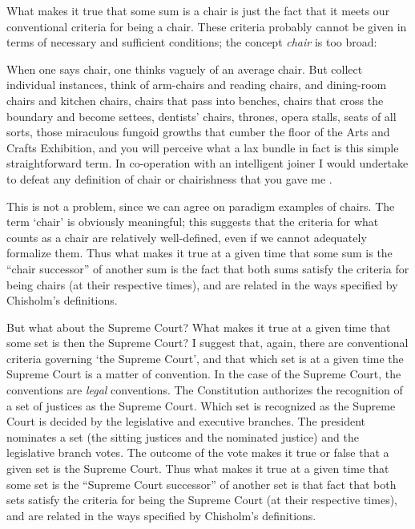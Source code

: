\documentclass[11pt]{article}
\newenvironment{squote}{%
\begin{spacing}{1}
\begin{list}{}{%
\setlength{\labelwidth}{0pt}%
\rightmargin\leftmargin%
}
\item\relax
}{%
\end{list}%
\end{spacing}
}
\begin{document}
\begin{spacing}{1.5}
What makes it true that some sum is a chair is just the fact that it
meets our conventional criteria for being a chair.  These criteria
probably cannot be given in terms of necessary and sufficient
conditions; the concept {\em chair} is too broad:

\begin{squote}
When one says chair, one thinks vaguely of an average chair.  But
collect individual instances, think of arm-chairs and reading chairs,
and dining-room chairs and kitchen chairs, chairs that pass into
benches, chairs that cross the boundary and become settees, dentists'
chairs, thrones, opera stalls, seats of all sorts, those miraculous
fungoid growths that cumber the floor of the Arts and Crafts
Exhibition, and you will perceive what a lax bundle in fact is this
simple straightforward term.  In co-operation with an intelligent
joiner I would undertake to defeat any definition of chair or
chairishness that you gave me \citep[384--385]{wells1904}.
\end{squote}
This is not a problem, since we can agree on paradigm examples of
chairs.  The term `chair' is obviously meaningful; this suggests that
the criteria for what counts as a chair are relatively well-defined,
even if we cannot adequately formalize them.  Thus what makes it true
at a given time that some sum is the ``chair successor'' of another
sum is the fact that both sums satisfy the criteria for being chairs
(at their respective times), and are related in the ways specified by
Chisholm's definitions.

But what about the Supreme Court?  What makes it true at a given time
that some set is then the Supreme Court?  I suggest that, again, there
are conventional criteria governing `the Supreme Court', and that
which set is at a given time the Supreme Court is a matter of
convention.  In the case of the Supreme Court, the conventions are
{\em legal} conventions.  The Constitution authorizes the recognition
of a set of justices as the Supreme Court.  Which set is recognized as
the Supreme Court is decided by the legislative and executive
branches.  The president nominates a set (the sitting justices and the
nominated justice) and the legislative branch votes.  The outcome of
the vote makes it true or false that a given set is the Supreme Court.
Thus what makes it true at a given time that some set is the ``Supreme
Court successor'' of another set is that fact that both sets satisfy
the criteria for being the Supreme Court (at their respective times),
and are related in the ways specified by Chisholm's definitions.


\end{spacing}
\end{document}
